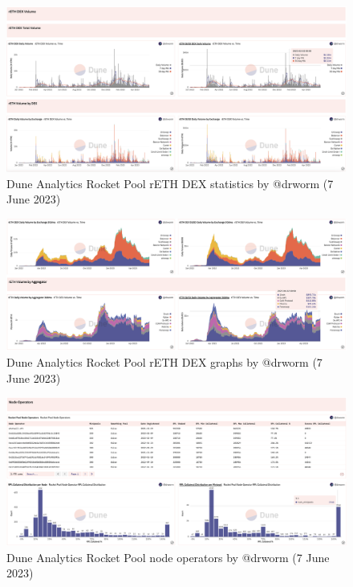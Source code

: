 \documentclass[UTF8]{article}
\begin{document}
{\begin{figure}[htbp]
\begin{center}
\includegraphics[width=\linewidth]{images/rocketdrworm6}
\caption{Dune Analytics Rocket Pool rETH DEX statistics by @drworm  (7 June 2023)}
\label{fig:rocketdrworm6}
\end{center}
\end{figure}

\begin{figure}[htbp]
\begin{center}
\includegraphics[width=\linewidth]{images/rocketdrworm7}
\caption{Dune Analytics Rocket Pool rETH DEX graphs by @drworm  (7 June 2023)}
\label{fig:rocketdrworm7}
\end{center}
\end{figure}

\begin{figure}[htbp]
\begin{center}
\includegraphics[width=\linewidth]{images/rocketdrworm8}
\caption{Dune Analytics Rocket Pool node operators by @drworm  (7 June 2023)}
\label{fig:rocketdrworm8}
\end{center}
\end{figure}

}
\end{document}
